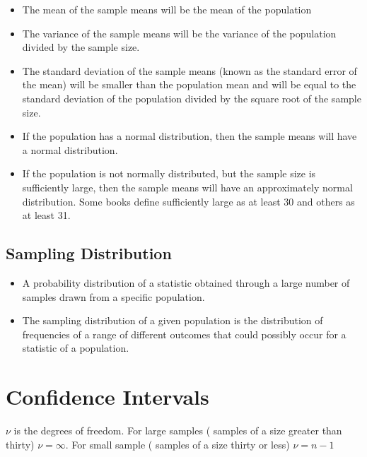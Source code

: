 \documentclass[]{report}
\begin{document}
\begin{itemize}
\item The mean of the sample means will be the mean of the population
\item The variance of the sample means will be the variance of the population divided by the sample size.
\item The standard deviation of the sample means (known as the standard error of the mean) will be smaller than the population mean and will be equal to the standard deviation of the population divided by the square root of the sample size.
\item If the population has a normal distribution, then the sample means will have a normal distribution.
\item If the population is not normally distributed, but the sample size is sufficiently large, then the sample means will have an approximately normal distribution. Some books define sufficiently large as at least 30 and others as at least 31.
\end{itemize}




\subsection{Sampling Distribution}
\begin{itemize}

\item A probability distribution of a statistic obtained through a large number of samples drawn from a specific population. 
\item The sampling distribution of a given population is the distribution of frequencies of a range of different outcomes 
that could possibly occur for a statistic of a population. 
\end{itemize}


\section{Confidence Intervals}

$\nu$ is the degrees of freedom. For large samples ( samples of a
size greater than thirty) $\nu = \infty$. For small sample (
samples of a size thirty or less)  $\nu = n-1$
\end{document}
